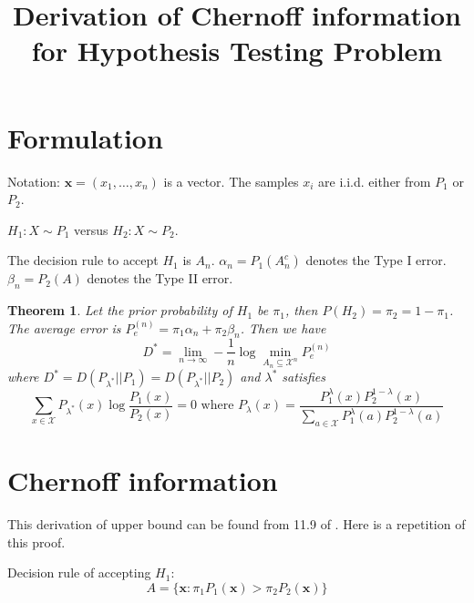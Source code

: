 \documentclass{article}
\title{Derivation of Chernoff information for Hypothesis Testing Problem}
\newtheorem{theorem}{Theorem}
\begin{document}
\maketitle
\section{Formulation}
Notation: $\bm{x} = (x_1, \dots, x_n)$ is a vector. The samples $x_i$ are i.i.d. either from $P_1$ or $P_2$.

$ H_1: X \sim P_1 $ versus $ H_2:  X \sim P_2 $.

The decision rule to accept $H_1$ is $A_n$.
$\alpha_n = P_1(A^c_n)$ denotes the Type I error. $\beta_n = P_2(A)$ denotes the Type II error.

\begin{theorem}
Let the prior probability of $H_1$ be $\pi_1$, then $P(H_2) = \pi_2 = 1 - \pi_1$. The average error is
$P_e^{(n)} = \pi_1 \alpha_n + \pi_2 \beta_n$. Then we have
\begin{equation}
D^* = \lim_{n \to \infty} -\frac{1}{n} \log \min_{A_n \subseteq \mathcal{X}^n} P_e^{(n)}
\end{equation}
where $D^* = D(P_{\lambda^*} || P_1) = D(P_{\lambda^*} || P_2)$ and $\lambda^*$ satisfies
\begin{equation}
\sum_{x\in \mathcal{X}} P_{\lambda^*}(x) \log \frac{P_1(x)}{P_2(x)} = 0 \textrm{ where }
P_{\lambda}(x) = \frac{P_1^{\lambda}(x)P_2^{1-\lambda}(x)}{\sum_{a\in \mathcal{X}}P_1^{\lambda}(a)P_2^{1-\lambda}(a)}
\end{equation}

\end{theorem}
\section{Chernoff information}
This derivation of upper bound can be found from 11.9 of \cite{it}. Here is a repetition of this proof.


Decision rule of accepting $H_1$:
\begin{equation}
A=\{\bm{x}: \pi_1 P_1(\bm{x}) > \pi_2 P_2(\bm{x})\}
\end{equation}
\end{document}
